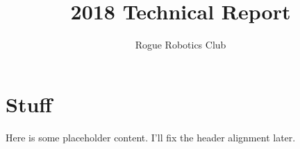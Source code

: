 \documentclass{roguedoc}
\title{2018 Technical Report}
\author{Rogue Robotics Club}
\begin{document}
\roguetoc{}

\section{Stuff}
Here is some placeholder content. I'll fix the header alignment later.
\end{document}
